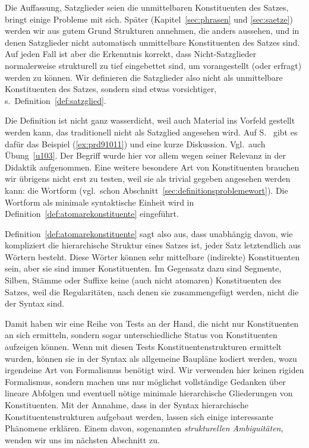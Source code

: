 Die Auffassung, Satzglieder seien die unmittelbaren Konstituenten des Satzes, bringt einige Probleme mit sich.
Später (Kapitel~\ref{sec:phrasen} und \ref{sec:saetze}) werden wir aus gutem Grund Strukturen annehmen, die anders aussehen, und in denen Satzglieder nicht automatisch unmittelbare Konstituenten des Satzes sind.
Auf jeden Fall ist aber die Erkenntnis korrekt, dass Nicht-Satzglieder normalerweise strukturell zu tief eingebettet sind, um \zB vorangestellt (oder erfragt) werden zu können.
Wir definieren die Satzglieder also nicht als unmittelbare Konstituenten des Satzes, sondern sind etwas vorsichtiger, s.\ Definition~\ref{def:satzglied}.


Die Definition ist nicht ganz wasserdicht, weil auch Material ins Vorfeld gestellt werden kann, das traditionell nicht als Satzglied angesehen wird.
Auf S.~\pageref{abs:satzgliedfail} gibt es dafür das Beispiel (\ref{ex:prd91011}) und eine kurze Diskussion.
Vgl.\ auch Übung~\ref{u103}.
Der Begriff wurde hier vor allem wegen seiner Relevanz in der Didaktik aufgenommen.
Eine weitere besondere Art von Konstituenten brauchen wir übrigens nicht erst zu testen, weil sie als trivial gegeben angesehen werden kann: die Wortform (vgl.\ schon Abschnitt~\ref{sec:definitionsproblemewort}).
Die Wortform als minimale syntaktische Einheit wird in Definition~\ref{def:atomarekonstituente} eingeführt.


Definition~\ref{def:atomarekonstituente} sagt also aus, dass unabhängig davon, wie kompliziert die hierarchische Struktur eines Satzes ist, jeder Satz letztendlich aus Wörtern besteht.
Diese Wörter können sehr mittelbare (indirekte) Konstituenten sein, aber sie sind immer Konstituenten.
Im Gegensatz dazu sind Segmente, Silben, Stämme oder Suffixe keine (auch nicht atomaren) Konstituenten des Satzes, weil die Regularitäten, nach denen sie zusammengefügt werden, nicht die der Syntax sind.

Damit haben wir eine Reihe von Tests an der Hand, die nicht nur Konstituenten an sich ermitteln, sondern sogar unterschiedliche Status von Konstituenten aufzeigen können.
Wenn mit diesen Tests Konstituentenstrukturen ermittelt wurden, können sie in der Syntax als allgemeine Baupläne kodiert werden, wozu irgendeine Art von Formalismus benötigt wird.
Wir verwenden hier keinen rigiden Formalismus, sondern machen uns nur möglichst vollständige Gedanken über lineare Abfolgen und eventuell nötige minimale hierarchische Gliederungen von Konstituenten.
Mit der Annahme, dass in der Syntax hierarchische Konstituentenstrukturen aufgebaut werden, lassen sich einige interessante Phänomene erklären.
Einem davon, sogenannten \textit{strukturellen Ambiguitäten}, wenden wir uns im nächsten Abschnitt zu.

